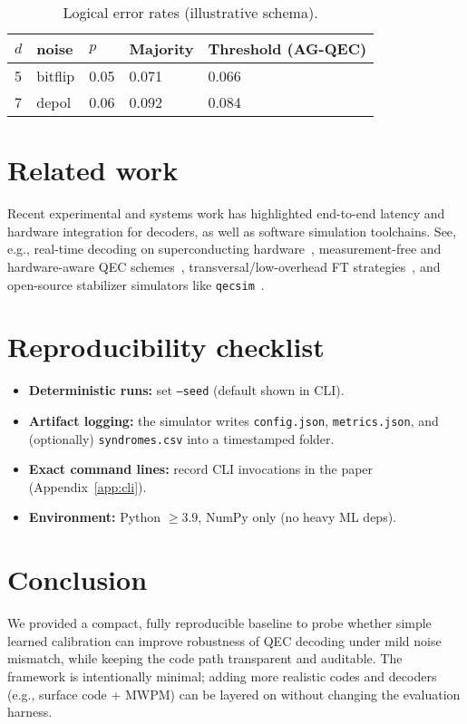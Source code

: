 \documentclass[11pt]{article}
\begin{document}
\begin{table}[H]
  \centering
  \caption{Logical error rates (illustrative schema).}
  \begin{tabular}{lllll}
  \toprule
  $d$ & noise & $p$ & Majority & Threshold (AG-QEC) \\
  \midrule
  5 & bitflip & 0.05 & 0.071 & 0.066 \\
  7 & depol   & 0.06 & 0.092 & 0.084 \\
  \bottomrule
  \end{tabular}
  \label{tab:results}
\end{table}

\section{Related work}
Recent experimental and systems work has highlighted end-to-end latency and hardware integration for decoders, as well as software simulation toolchains. See, e.g., real-time decoding on superconducting hardware~\cite{rigetti_realtime_qec_2024}, measurement-free and hardware-aware QEC schemes~\cite{locher_mf_ft_2024}, transversal/low-overhead FT strategies~\cite{transversal_2024}, and open-source stabilizer simulators like \texttt{qecsim}~\cite{tuckett_qecsim}.

\section{Reproducibility checklist}
\begin{itemize}[leftmargin=*]
  \item \textbf{Deterministic runs:} set \texttt{--seed} (default shown in CLI).
  \item \textbf{Artifact logging:} the simulator writes \texttt{config.json}, \texttt{metrics.json}, and (optionally) \texttt{syndromes.csv} into a timestamped folder.
  \item \textbf{Exact command lines:} record CLI invocations in the paper (Appendix~\ref{app:cli}).
  \item \textbf{Environment:} Python $\ge 3.9$, NumPy only (no heavy ML deps).
\end{itemize}

\section{Conclusion}
We provided a compact, fully reproducible baseline to probe whether simple learned calibration can improve robustness of QEC decoding under mild noise mismatch, while keeping the code path transparent and auditable. The framework is intentionally minimal; adding more realistic codes and decoders (e.g., surface code + MWPM) can be layered on without changing the evaluation harness.
\end{document}
